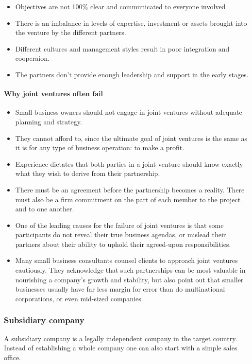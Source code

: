 \begin{itemize}
	\tightlist
	\item Objectives are not 100\% clear and communicated to everyone involved
	\item There is an imbalance in levels of expertise, investment or assets brought into the venture by the different partners.
	\item Different cultures and management styles result in poor integration and cooperaion.
	\item The partners don't provide enough leadership and support in the early stages.
\end{itemize}

\paragraph{Why joint ventures often fail}

\begin{itemize}
	\tightlist
	\item Small business owners should not engage in joint ventures without adequate 	planning and strategy.
	\item They cannot afford to, since the ultimate goal of joint ventures is the same as it is for any type of business operation: to make a profit.
	\item Experience dictates that both parties in a joint venture should know exactly 	what they wish to derive from their partnership.
	\item There must be an agreement before the partnership becomes a reality. There must also be a firm commitment on the part of each member to the project and to one another.
	\item One of the leading causes for the failure of joint ventures is that some participants do not reveal their true business agendas, or mislead their partners about their ability to uphold their agreed-upon responsibilities.
	\item Many small business consultants counsel clients to approach joint ventures cautiously. They acknowledge that such partnerships can be most valuable in nourishing a company's growth and stability, but also point out that smaller businesses usually have far less margin for error than do multinational corporations, or even mid-sized companies.
\end{itemize}

\subsubsection{Subsidiary company}
A subsidiary company is a legally independent company in the target country. Instead of establishing a whole company one can also start with a simple sales office.

